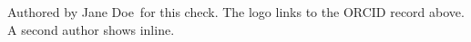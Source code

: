 \documentclass{article}
\begin{document}
Authored by Jane Doe\, for this check.
The logo links to the ORCID record above.
A second author shows  inline.
\end{document}
